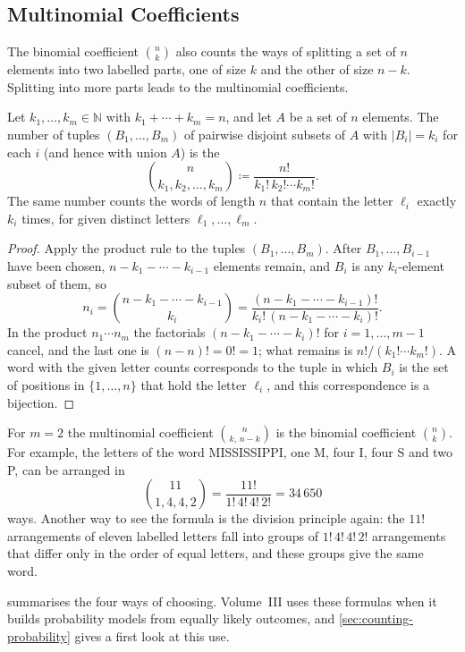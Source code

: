 \subsection{Multinomial Coefficients}

The binomial coefficient $\binom nk$ also counts the ways of splitting a set of $n$ elements into two labelled parts, one of size $k$ and the other of size $n-k$. Splitting into more parts leads to the multinomial coefficients.

\begin{theorem}
\label{thm:multinomial}
Let $k_1,\ldots,k_m\in\mathbb N$ with $k_1+\cdots+k_m=n$, and let $A$ be a set of $n$ elements. The number of tuples $(B_1,\ldots,B_m)$ of pairwise disjoint subsets of $A$ with $|B_i|=k_i$ for each $i$ (and hence with union $A$) is the 
\[
\binom{n}{k_1,k_2,\ldots,k_m}\coloneqq\frac{n!}{k_1!\,k_2!\cdots k_m!}.
\]
The same number counts the words of length $n$ that contain the letter $\ell_i$ exactly $k_i$ times, for given distinct letters $\ell_1,\ldots,\ell_m$.
\end{theorem}

\begin{proof}
Apply the product rule to the tuples $(B_1,\ldots,B_m)$. After $B_1,\ldots,B_{i-1}$ have been chosen, $n-k_1-\cdots-k_{i-1}$ elements remain, and $B_i$ is any $k_i$-element subset of them, so
\[
n_i=\binom{n-k_1-\cdots-k_{i-1}}{k_i}=\frac{(n-k_1-\cdots-k_{i-1})!}{k_i!\,(n-k_1-\cdots-k_i)!}.
\]
In the product $n_1\cdots n_m$ the factorials $(n-k_1-\cdots-k_i)!$ for $i=1,\ldots,m-1$ cancel, and the last one is $(n-n)!=0!=1$; what remains is $n!/(k_1!\cdots k_m!)$. A word with the given letter counts corresponds to the tuple in which $B_i$ is the set of positions in $\{1,\ldots,n\}$ that hold the letter $\ell_i$, and this correspondence is a bijection.
\end{proof}

For $m=2$ the multinomial coefficient $\binom{n}{k,\,n-k}$ is the binomial coefficient $\binom nk$. For example, the letters of the word MISSISSIPPI, one M, four I, four S and two P, can be arranged in
\[
\binom{11}{1,4,4,2}=\frac{11!}{1!\,4!\,4!\,2!}=34\,650
\]
ways. Another way to see the formula is the division principle again: the $11!$ arrangements of eleven labelled letters fall into groups of $1!\,4!\,4!\,2!$ arrangements that differ only in the order of equal letters, and these groups give the same word.

 summarises the four ways of choosing. Volume~III uses these formulas when it builds probability models from equally likely outcomes, and \cref{sec:counting-probability} gives a first look at this use.

